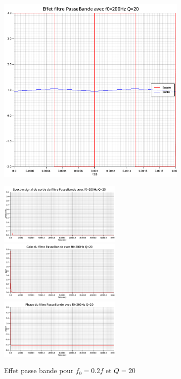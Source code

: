 \documentclass{article}
\begin{document}
\begin{figure}[H]
  \begin{minipage}{0.6\textwidth}
      \centering
      \includegraphics[width=25em]{images/creneau/bande/q=20/0.2/signals.png}
  \end{minipage}
  \begin{minipage}{0.3\textwidth}
      \centering
      \includegraphics[width=16em]{images/creneau/bande/q=20/0.2/fft_out.png}
      \vfill
      \includegraphics[width=16em]{images/creneau/bande/q=20/0.2/gain.png}
      \vfill
      \includegraphics[width=16em]{images/creneau/bande/q=20/0.2/phase.png}
  \end{minipage}
  \caption{Effet passe bande pour $f_0=0.2f$ et $Q=20$}
\end{figure}
\end{document}

